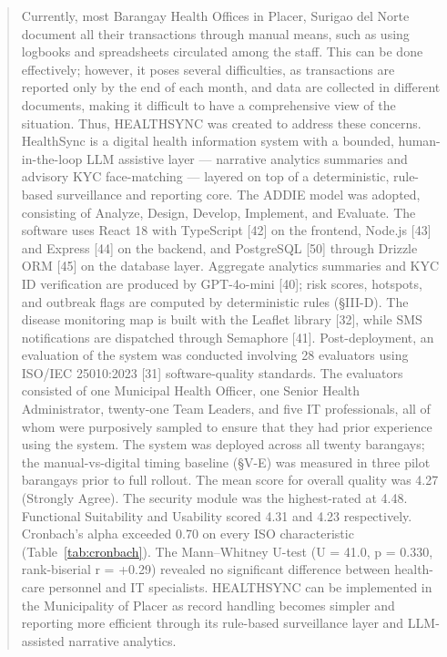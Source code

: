 \documentclass[conference]{IEEEtran}
\begin{document}
\begin{abstract}
Currently, most Barangay Health Offices in Placer, Surigao del Norte document all their transactions through manual means, such as using logbooks and spreadsheets circulated among the staff. This can be done effectively; however, it poses several difficulties, as transactions are reported only by the end of each month, and data are collected in different documents, making it difficult to have a comprehensive view of the situation. Thus, HEALTHSYNC was created to address these concerns. HealthSync is a digital health information system with a bounded, human-in-the-loop LLM assistive layer --- narrative analytics summaries and advisory KYC face-matching --- layered on top of a deterministic, rule-based surveillance and reporting core. The ADDIE model was adopted, consisting of Analyze, Design, Develop, Implement, and Evaluate. The software uses React 18 with TypeScript [42] on the frontend, Node.js [43] and Express [44] on the backend, and PostgreSQL [50] through Drizzle ORM [45] on the database layer. Aggregate analytics summaries and KYC ID verification are produced by GPT-4o-mini [40]; risk scores, hotspots, and outbreak flags are computed by deterministic rules (\S III-D). The disease monitoring map is built with the Leaflet library [32], while SMS notifications are dispatched through Semaphore [41]. Post-deployment, an evaluation of the system was conducted involving 28 evaluators using ISO/IEC 25010:2023 [31] software-quality standards. The evaluators consisted of one Municipal Health Officer, one Senior Health Administrator, twenty-one Team Leaders, and five IT professionals, all of whom were purposively sampled to ensure that they had prior experience using the system. The system was deployed across all twenty barangays; the manual-vs-digital timing baseline (\S V-E) was measured in three pilot barangays prior to full rollout. The mean score for overall quality was 4.27 (Strongly Agree). The security module was the highest-rated at 4.48. Functional Suitability and Usability scored 4.31 and 4.23 respectively. Cronbach's alpha exceeded 0.70 on every ISO characteristic (Table~\ref{tab:cronbach}). The Mann--Whitney U-test (U = 41.0, p = 0.330, rank-biserial r = +0.29) revealed no significant difference between health-care personnel and IT specialists. HEALTHSYNC can be implemented in the Municipality of Placer as record handling becomes simpler and reporting more efficient through its rule-based surveillance layer and LLM-assisted narrative analytics.
\end{abstract}
\end{document}
